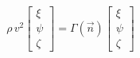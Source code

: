 \documentclass[preview]{standalone}
\begin{document}
\begin{align*}
\rho\, v^2
            \begin{bmatrix} \xi \\ \psi \\ \zeta \end{bmatrix}
            = \Gamma(\vec{n})
            \begin{bmatrix} \xi \\ \psi \\ \zeta \end{bmatrix}
\end{align*}
\end{document}
